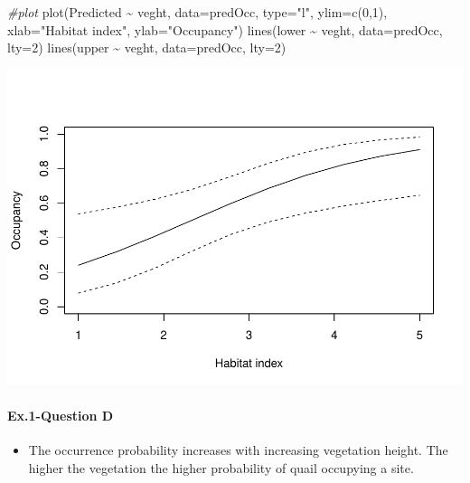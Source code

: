 \documentclass[
]{article}
\newenvironment{Shaded}{\begin{snugshade}}{\end{snugshade}}
\newcommand{\AttributeTok}[1]{\textcolor[rgb]{0.77,0.63,0.00}{#1}}
\newcommand{\CommentTok}[1]{\textcolor[rgb]{0.56,0.35,0.01}{\textit{#1}}}
\newcommand{\DecValTok}[1]{\textcolor[rgb]{0.00,0.00,0.81}{#1}}
\newcommand{\FunctionTok}[1]{\textcolor[rgb]{0.00,0.00,0.00}{#1}}
\newcommand{\NormalTok}[1]{#1}
\newcommand{\SpecialCharTok}[1]{\textcolor[rgb]{0.00,0.00,0.00}{#1}}
\newcommand{\StringTok}[1]{\textcolor[rgb]{0.31,0.60,0.02}{#1}}
\providecommand{\tightlist}{%
  \setlength{\itemsep}{0pt}\setlength{\parskip}{0pt}}
\begin{document}
\begin{Shaded}
\begin{Highlighting}[]
\CommentTok{\#plot}
\FunctionTok{plot}\NormalTok{(Predicted }\SpecialCharTok{\textasciitilde{}}\NormalTok{ veght, }\AttributeTok{data=}\NormalTok{predOcc, }\AttributeTok{type=}\StringTok{"l"}\NormalTok{, }\AttributeTok{ylim=}\FunctionTok{c}\NormalTok{(}\DecValTok{0}\NormalTok{,}\DecValTok{1}\NormalTok{),}
     \AttributeTok{xlab=}\StringTok{"Habitat index"}\NormalTok{, }\AttributeTok{ylab=}\StringTok{"Occupancy"}\NormalTok{)}
\FunctionTok{lines}\NormalTok{(lower }\SpecialCharTok{\textasciitilde{}}\NormalTok{ veght, }\AttributeTok{data=}\NormalTok{predOcc, }\AttributeTok{lty=}\DecValTok{2}\NormalTok{)}
\FunctionTok{lines}\NormalTok{(upper }\SpecialCharTok{\textasciitilde{}}\NormalTok{ veght, }\AttributeTok{data=}\NormalTok{predOcc, }\AttributeTok{lty=}\DecValTok{2}\NormalTok{)}
\end{Highlighting}
\end{Shaded}

\includegraphics{occupancy-lab_files/figure-latex/plot-1.pdf}

\hypertarget{ex.1-question-d}{%
\paragraph{\texorpdfstring{\textbf{Ex.1-Question
D}}{Ex.1-Question D}}\label{ex.1-question-d}}

\begin{itemize}
\tightlist
\item
  The occurrence probability increases with increasing vegetation
  height. The higher the vegetation the higher probability of quail
  occupying a site.
\end{itemize}
\end{document}
